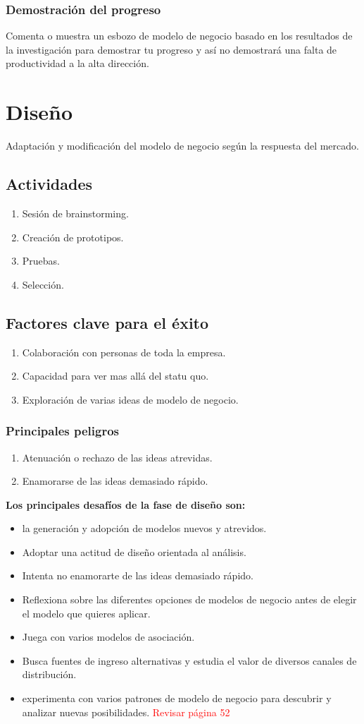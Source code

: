\documentclass[11pt]{book}
\begin{document}
\subsubsection{Demostración del progreso}
Comenta o muestra un esbozo de modelo de negocio basado en los resultados de la investigación para demostrar tu progreso y así no demostrará una falta de productividad a la alta dirección.
\section{Diseño}
Adaptación y modificación del modelo de negocio según la respuesta del mercado.
\subsection{Actividades}
\begin{enumerate}
\item Sesión de brainstorming.
\item Creación de prototipos.
\item Pruebas.
\item Selección.
\end{enumerate}
\subsection{Factores clave para el éxito}
\begin{enumerate}
\item Colaboración con personas de toda la empresa.
\item Capacidad para ver mas allá del statu quo.
\item Exploración de varias ideas de modelo de negocio.
\end{enumerate}
\subsubsection{Principales peligros}
\begin{enumerate}
\item Atenuación o rechazo de las ideas atrevidas.
\item Enamorarse de las ideas demasiado rápido.
\end{enumerate}
\textbf{Los principales desafíos de la fase de diseño son:}
\begin{itemize}
\item la generación y adopción de modelos nuevos y atrevidos.
\item Adoptar una actitud de diseño orientada al análisis.
\item Intenta no enamorarte de las ideas demasiado rápido.
\item Reflexiona sobre las diferentes opciones de modelos de negocio antes de elegir el modelo que quieres aplicar.
\item Juega con varios modelos de asociación.
\item Busca fuentes de ingreso alternativas y estudia el valor de diversos canales de distribución.
\item experimenta con varios patrones de modelo de negocio para descubrir y analizar nuevas posibilidades. \textcolor{red}{Revisar página 52}
\end{itemize} 
\end{document}

